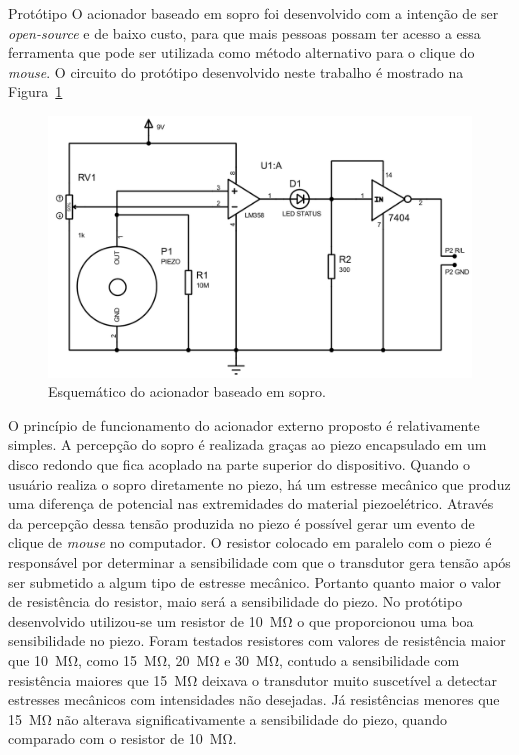 \begin{chapter}{Protótipo}
O acionador baseado em sopro foi desenvolvido com a intenção de ser
\textit{open-source} e de baixo custo, para que mais pessoas possam ter acesso
a essa ferramenta que pode ser utilizada como método alternativo para o clique
do \textit{mouse}. O circuito do protótipo desenvolvido neste trabalho é mostrado 
na Figura~\ref{fig:circuito}

\begin{figure}[!h]
	\centering
	\begin{minipage}[c]{\textwidth}
	\centering
	\includegraphics[width=1\linewidth]{fig/acionador}
	\caption{Esquemático do acionador baseado em sopro.}
	\label{fig:circuito}
	\end{minipage}
\end{figure} 

O princípio de funcionamento do acionador externo proposto é relativamente
simples. A percepção do sopro é realizada graças ao piezo encapsulado em um
disco redondo que fica acoplado na parte superior do dispositivo. Quando o
usuário realiza o sopro diretamente no piezo, há um estresse mecânico que produz
uma diferença de potencial nas extremidades do material piezoelétrico. Através
da percepção dessa tensão produzida no piezo é possível gerar um evento de
clique de \textit{mouse} no computador. O resistor colocado em paralelo com o
piezo é responsável por determinar a sensibilidade com que o transdutor gera
tensão após ser submetido a algum tipo de estresse mecânico. Portanto quanto
maior o valor de resistência do resistor, maio será a sensibilidade do piezo.
No protótipo desenvolvido utilizou-se um resistor de 10~M\si{\ohm} o que
proporcionou uma boa sensibilidade no piezo. Foram testados resistores com
valores de resistência maior que 10~M\si{\ohm}, como 15~M\si{\ohm}, 20~M\si{\ohm} e
30~M\si{\ohm}, contudo a sensibilidade com resistência maiores que 15~M\si{\ohm}
deixava o transdutor muito suscetível a detectar estresses mecânicos com
intensidades não desejadas. Já resistências menores que 15~M\si{\ohm} não
alterava significativamente a sensibilidade do piezo, quando comparado com o
resistor de 10~M\si{\ohm}. 


\end{chapter}
